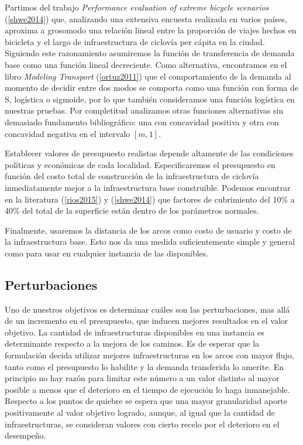 \documentclass{article}
\begin{document}
  Partimos del trabajo {\it Performance evaluation of extreme bicycle scenarios} (\ref{shwe2014}) que, analizando una extensiva encuesta realizada en varios países, aproxima a grosomodo una relación lineal entre la proporción de viajes hechos en bicicleta y el largo de infraestructura de ciclovía per cápita en la ciudad. Siguiendo este razonamiento asumiremos la función de transferencia de demanda base como una función lineal decreciente. Como alternativa, encontramos en el libro {\it Modeling Transport} (\ref{ortuz2011}) que el comportamiento de la demanda al momento de decidir entre dos modos se comporta como una función con forma de S, logística o sigmoide, por lo que también consideramos una función logística en nuestras pruebas. Por completitud analizamos otras funciones alternativas sin demasiado fundamento bibliográfico: una con concavidad positiva y otra con concavidad negativa en el intervalo $[m, 1]$.

  Establecer valores de presupuesto realistas depende altamente de las condiciones políticas y económicas de cada localidad. Especificaremos el presupuesto en función del costo total de construcción de la infraestructura de ciclovía inmediatamente mejor a la infraestructura base construible. Podemos encontrar en la literatura (\ref{rios2015}) y (\ref{shwe2014}) que factores de cubrimiento del 10\% a 40\% del total de la superficie están dentro de los parámetros normales.

  Finalmente, usaremos la distancia de los arcos como costo de usuario y costo de la infraestructura base. Esto nos da una medida suficientemente simple y general como para usar en cualquier instancia de las disponibles.

  \subsection{Perturbaciones}

  Uno de nuestros objetivos es determinar cuáles son las perturbaciones, mas allá de un incremento en el presupuesto, que inducen mejores resultados en el valor objetivo. La cantidad de infraestructuras disponibles en una instancia es determinante respecto a la mejora de los caminos. Es de esperar que la formulación decida utilizar mejores infraestructuras en los arcos con mayor flujo, tanto como el presupuesto lo habilite y la demanda transferida lo amerite. En principio no hay razón para limitar este número a un valor distinto al mayor posible a menos que el deterioro en el tiempo de ejecución lo haga inmanejable. Respecto a los puntos de quiebre se espera que una mayor granularidad aporte positivamente al valor objetivo logrado, aunque, al igual que la cantidad de infraestructuras, se consideran valores con cierto recelo por el deterioro en el desempeño.
\end{document}
